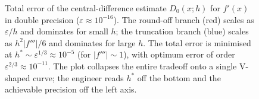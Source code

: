 \begin{figure}[ht]
\caption[Bias-variance tradeoff in numerical differentiation]{Total
error of the central-difference estimate $D_{0}(x; h)$ for $f'(x)$
in double precision ($\varepsilon \approx 10^{-16}$). The round-off
branch (red) scales as $\varepsilon / h$ and dominates for small $h$;
the truncation branch (blue) scales as $h^{2} |f'''|/6$ and dominates
for large $h$. The total error is minimised at $h^{*} \sim
\varepsilon^{1/3} \approx 10^{-5}$ (for $|f'''| \sim 1$), with
optimum error of order $\varepsilon^{2/3} \approx 10^{-11}$. The
plot collapses the entire tradeoff onto a single V-shaped curve;
the engineer reads $h^{*}$ off the bottom and the achievable
precision off the left axis.}
\label{fig:vol02:ch05:bias-variance}
\end{figure}
